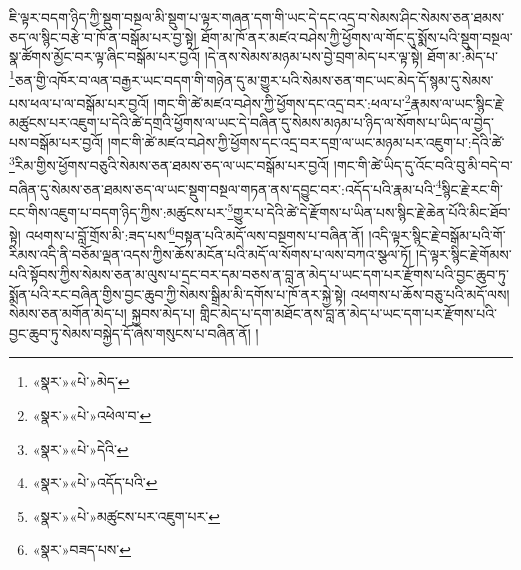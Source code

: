 ཇི་ལྟར་བདག་ཉིད་ཀྱི་སྡུག་བསྔལ་མི་སྡུག་པ་ལྟར་གཞན་དག་གི་ཡང་དེ་དང་འདྲ་བ་སེམས་ཤིང་སེམས་ཅན་ཐམས་ཅད་ལ་སྙིང་བརྩེ་བ་ཁོ་ན་བསྒོམ་པར་བྱ་སྟེ། ཐོག་མ་ཁོ་ནར་མཛའ་བཤེས་ཀྱི་ཕྱོགས་ལ་གོང་དུ་སྨོས་པའི་སྡུག་བསྔལ་སྣ་ཚོགས་མྱོང་བར་ལྟ་ཞིང་བསྒོམ་པར་བྱའོ། །དེ་ནས་སེམས་མཉམ་པས་བྱེ་བྲག་མེད་པར་ལྟ་སྟེ། ཐོག་མ་:མེད་པ་\footnote{«སྣར་»«པེ་»མེད་}ཅན་གྱི་འཁོར་བ་ལན་བརྒྱར་ཡང་བདག་གི་གཉེན་དུ་མ་གྱུར་པའི་སེམས་ཅན་གང་ཡང་མེད་དོ་སྙམ་དུ་སེམས་པས་ཕལ་པ་ལ་བསྒོམ་པར་བྱའོ། །གང་གི་ཚེ་མཛའ་བཤེས་ཀྱི་ཕྱོགས་དང་འདྲ་བར་:ཕལ་པ་\footnote{«སྣར་»«པེ་»འཕེལ་བ་}རྣམས་ལ་ཡང་སྙིང་རྗེ་མཚུངས་པར་འཇུག་པ་དེའི་ཚེ་དགྲའི་ཕྱོགས་ལ་ཡང་དེ་བཞིན་དུ་སེམས་མཉམ་པ་ཉིད་ལ་སོགས་པ་ཡིད་ལ་བྱེད་པས་བསྒོམ་པར་བྱའོ། །གང་གི་ཚེ་མཛའ་བཤེས་ཀྱི་ཕྱོགས་དང་འདྲ་བར་དགྲ་ལ་ཡང་མཉམ་པར་འཇུག་པ་:དེའི་ཚེ་\footnote{«སྣར་»«པེ་»དེའི་}རིམ་གྱིས་ཕྱོགས་བཅུའི་སེམས་ཅན་ཐམས་ཅད་ལ་ཡང་བསྒོམ་པར་བྱའོ། །གང་གི་ཚེ་ཡིད་དུ་འོང་བའི་བུ་མི་བདེ་བ་བཞིན་དུ་སེམས་ཅན་ཐམས་ཅད་ལ་ཡང་སྡུག་བསྔལ་གཏན་ནས་དབྱུང་བར་:འདོད་པའི་རྣམ་པའི་\footnote{«སྣར་»«པེ་»འདོད་པའི་}སྙིང་རྗེ་རང་གི་ངང་གིས་འཇུག་པ་བདག་ཉིད་ཀྱིས་:མཚུངས་པར་\footnote{«སྣར་»«པེ་»མཚུངས་པར་འཇུག་པར་}གྱུར་པ་དེའི་ཚེ་དེ་རྫོགས་པ་ཡིན་པས་སྙིང་རྗེ་ཆེན་པོའི་མིང་ཐོབ་སྟེ། འཕགས་པ་བློ་གྲོས་མི་:ཟད་པས་\footnote{«སྣར་»བཟད་པས་}བསྟན་པའི་མདོ་ལས་བསྔགས་པ་བཞིན་ནོ། །འདི་ལྟར་སྙིང་རྗེ་བསྒོམ་པའི་གོ་རིམས་འདི་ནི་བཅོམ་ལྡན་འདས་ཀྱིས་ཆོས་མངོན་པའི་མདོ་ལ་སོགས་པ་ལས་བཀའ་སྩལ་ཏོ། །དེ་ལྟར་སྙིང་རྗེ་གོམས་པའི་སྟོབས་ཀྱིས་སེམས་ཅན་མ་ལུས་པ་དྲང་བར་དམ་བཅས་ན་བླ་ན་མེད་པ་ཡང་དག་པར་རྫོགས་པའི་བྱང་ཆུབ་ཏུ་སྨོན་པའི་རང་བཞིན་གྱིས་བྱང་ཆུབ་ཀྱི་སེམས་སྒྲིམ་མི་དགོས་པ་ཁོ་ནར་སྐྱེ་སྟེ། འཕགས་པ་ཆོས་བཅུ་པའི་མདོ་ལས། སེམས་ཅན་མགོན་མེད་པ། སྐྱབས་མེད་པ། གླིང་མེད་པ་དག་མཐོང་ནས་བླ་ན་མེད་པ་ཡང་དག་པར་རྫོགས་པའི་བྱང་ཆུབ་ཏུ་སེམས་བསྐྱེད་དོ་ཞེས་གསུངས་པ་བཞིན་ནོ། །
